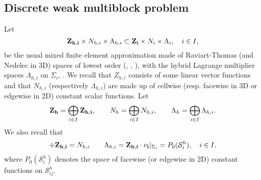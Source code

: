 \documentclass{article}
\newcommand{\Sh}[1]{\mathcal{S}^{h}_{#1}}
\begin{document}
\subsection{Discrete weak multiblock problem}
Let 
\[ {\bf Z_{h,i}} \times N_{h,i} \times \Lambda_{h,i} 
\subset  {\bf Z_{i}} \times N_{i} \times \Lambda_{i} , \quad i \in I,
\]
be the usual mixed finite element approximation made of Raviart-Thomas (and
Nedelec in 3D) spaces of lowest order (\cite{ravtho}, \cite{robtho},
\cite{ned86}), with the hybrid Lagrange multiplier spaces $\Lambda_{h,i}$ on 
$\Sigma_i$, \cite{brefor}. We recall that
$Z_{h,i}$ consists of some linear vector functions and that $N_{h,i}$ 
(respectively $\Lambda_{h,i}$) are 
made up of cellwise (resp. facewise in 3D or edgewise in 2D) constant scalar functions. 
Let 
\[ 
{\bf Z_{h}} = \bigoplus_{i \in I} {\bf Z_{h,i}}, \qquad 
N_{h} = \bigoplus_{i \in I}N_{h,i}, \qquad 
\Lambda_{h}= \bigoplus_{i \in I}\Lambda_{h,i}.
\]
We also recall that
\[  \div {\bf Z_{h,i}} = N_{h,i} \qquad \Lambda_{h,i} 
= {\bf Z_{h,i} \cdot \nu_{i}}|_{\Sigma_i} = P_0(\Sh{i}), \quad i \in I,
\]
where $P_0(\Sh{i})$ denotes the space of facewise (or edgewise in 2D) constant
functions on $\Sh{ij}$.
\end{document}
